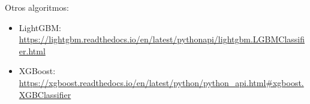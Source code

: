 \documentclass{article}
\begin{document}
Otros algoritmos:
\begin{itemize}
\item LightGBM: \href{https://lightgbm.readthedocs.io/en/latest/pythonapi/lightgbm.LGBMClassifier.html}{https://lightgbm.readthedocs.io/en/latest/pythonapi/lightgbm.LGBMClassifier.html}
\item XGBoost: \href{https://xgboost.readthedocs.io/en/latest/python/python_api.html#xgboost.XGBClassifier}{https://xgboost.readthedocs.io/en/latest/python/python\_api.html\#xgboost.XGBClassifier}
\end{itemize}
\end{document}
